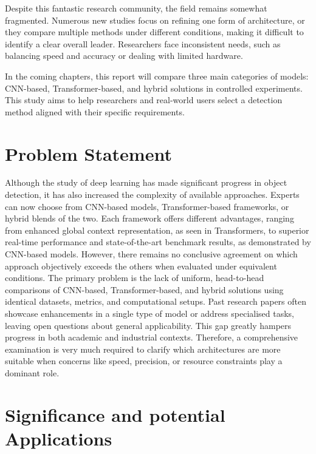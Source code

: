 Despite this fantastic research community, the field remains somewhat fragmented. Numerous new studies focus on refining one form of architecture, or they compare multiple methods under different conditions, making it difficult to identify a clear overall leader. Researchers face inconsistent needs, such as balancing speed and accuracy or dealing with limited hardware.

In the coming chapters, this report will compare three main categories of models: CNN-based, Transformer-based, and hybrid solutions in controlled experiments. This study aims to help researchers and real-world users select a detection method aligned with their specific requirements.

\section{Problem Statement}
Although the study of deep learning has made significant progress in object detection, it has also increased the complexity of available approaches. Experts can now choose from CNN-based models, Transformer-based frameworks, or hybrid blends of the two. Each framework offers different advantages, ranging from enhanced global context representation, as seen in Transformers, to superior real-time performance and state-of-the-art benchmark results, as demonstrated by CNN-based models. However, there remains no conclusive agreement on which approach objectively exceeds the others when evaluated under equivalent conditions.
The primary problem is the lack of uniform, head-to-head comparisons of CNN-based, Transformer-based, and hybrid solutions using identical datasets, metrics, and computational setups.\cite{mdpi2025survey} Past research papers often showcase enhancements in a single type of model or address specialised tasks, leaving open questions about general applicability. This gap greatly hampers progress in both academic and industrial contexts. Therefore, a comprehensive examination is very much required to clarify which architectures are more suitable when concerns like speed, precision, or resource constraints play a dominant role.


\section{Significance and potential Applications}

